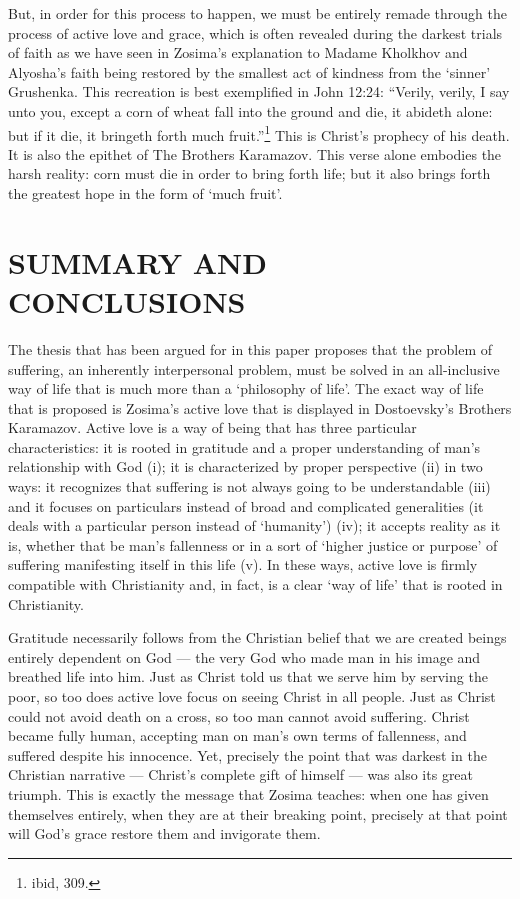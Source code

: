 But, in order for this process to happen, we must be entirely remade through the process of active love and grace, which is often revealed during the darkest trials of faith as we have seen in Zosima's explanation to Madame Kholkhov and Alyosha's faith being restored by the smallest act of kindness from the `sinner' Grushenka. This recreation is best exemplified  in John 12:24: ``Verily, verily, I say unto you, except a corn of wheat fall into the ground and die, it abideth alone: but if it die, it bringeth forth much fruit.''\footnote{ibid, 309.} This is Christ's prophecy of his death. It is also the epithet of The Brothers Karamazov. This verse alone embodies the harsh reality: corn must die in order to bring forth life; but it also brings forth the greatest hope in the form of `much fruit'.

\chapter{SUMMARY AND CONCLUSIONS}
The thesis that has been argued for in this paper proposes that the problem of suffering, an inherently interpersonal problem, must be solved in an all-inclusive way of life that is much more than a `philosophy of life'. The exact way of life that is proposed is Zosima's active love that is displayed in Dostoevsky's Brothers Karamazov. Active love is a way of being that has three particular characteristics: it is rooted in gratitude and a proper understanding of man's relationship with God (i); it is characterized by proper perspective (ii) in two ways: it recognizes that suffering is not always going to be understandable (iii) and it focuses on particulars instead of broad and complicated generalities (it deals with a particular person instead of `humanity') (iv); it accepts reality as it is, whether that be man's fallenness or in a sort of `higher justice or purpose' of suffering manifesting itself in this life (v). In these ways, active love is firmly compatible with Christianity and, in fact, is a clear `way of life' that is rooted in Christianity. 

Gratitude necessarily follows from the Christian belief that we are created beings entirely dependent on God --- the very God who made man in his image and breathed life into him. Just as Christ told us that we serve him by serving the poor, so too does active love focus on seeing Christ in all people. Just as Christ could not avoid death on a cross, so too man cannot avoid suffering. Christ became fully human, accepting man on man's own terms of fallenness, and suffered despite his innocence. Yet, precisely the point that was darkest in the Christian narrative --- Christ's complete gift of himself --- was also its great triumph. This is exactly the message that Zosima teaches: when one has given themselves entirely, when they are at their breaking point, precisely at that point will God's grace restore them and invigorate them.

